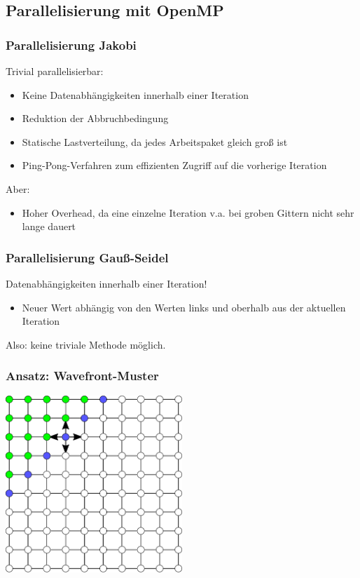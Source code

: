 \documentclass{beamer}
\begin{document}
\subsection{Parallelisierung mit OpenMP}
\begin{frame}
    \frametitle{Parallelisierung Jakobi}
    Trivial parallelisierbar:
    \begin{itemize}
        \item Keine Datenabhängigkeiten innerhalb einer Iteration
        \item Reduktion der Abbruchbedingung
        \item Statische Lastverteilung, da jedes Arbeitspaket gleich groß ist
        \item Ping-Pong-Verfahren zum effizienten Zugriff auf die vorherige Iteration
    \end{itemize}
    Aber:
    \begin{itemize}
        \item Hoher Overhead, da eine einzelne Iteration v.a. bei groben Gittern nicht sehr lange dauert
    \end{itemize}
\end{frame}

\begin{frame}
    \frametitle{Parallelisierung Gauß-Seidel}
    Datenabhängigkeiten innerhalb einer Iteration!
    \begin{itemize}
        \item Neuer Wert abhängig von den Werten links und oberhalb aus der aktuellen Iteration
    \end{itemize}
    Also: keine triviale Methode möglich.
\end{frame}

\begin{frame}
    \frametitle{Ansatz: Wavefront-Muster}
    \centering\includegraphics[width=0.5\textwidth]{wavefront-datadependencies}
\end{frame}
\end{document}
